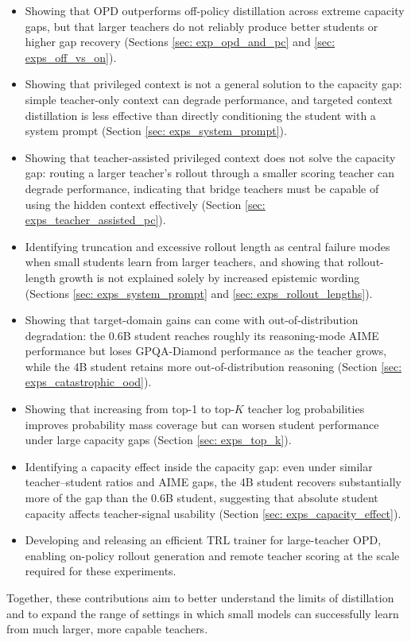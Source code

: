 \begin{itemize}
    \item Showing that OPD outperforms off-policy distillation across extreme capacity gaps, but that larger teachers do not reliably produce better students or higher gap recovery (Sections \ref{sec: exp_opd_and_pc} and \ref{sec: exps_off_vs_on}).
    \item Showing that privileged context is not a general solution to the capacity gap: simple teacher-only context can degrade performance, and targeted context distillation is less effective than directly conditioning the student with a system prompt (Section \ref{sec: exps_system_prompt}).
    \item Showing that teacher-assisted privileged context does not solve the capacity gap: routing a larger teacher's rollout through a smaller scoring teacher can degrade performance, indicating that bridge teachers must be capable of using the hidden context effectively (Section \ref{sec: exps_teacher_assisted_pc}).
    \item Identifying truncation and excessive rollout length as central failure modes when small students learn from larger teachers, and showing that rollout-length growth is not explained solely by increased epistemic wording (Sections \ref{sec: exps_system_prompt} and \ref{sec: exps_rollout_lengths}).
    \item Showing that target-domain gains can come with out-of-distribution degradation: the 0.6B student reaches roughly its reasoning-mode AIME performance but loses GPQA-Diamond performance as the teacher grows, while the 4B student retains more out-of-distribution reasoning (Section \ref{sec: exps_catastrophic_ood}).
    \item Showing that increasing from top-1 to top-$K$ teacher log probabilities improves probability mass coverage but can worsen student performance under large capacity gaps (Section \ref{sec: exps_top_k}).
    \item Identifying a capacity effect inside the capacity gap: even under similar teacher--student ratios and AIME gaps, the 4B student recovers substantially more of the gap than the 0.6B student, suggesting that absolute student capacity affects teacher-signal usability (Section \ref{sec: exps_capacity_effect}).
    \item Developing and releasing an efficient TRL trainer for large-teacher OPD, enabling on-policy rollout generation and remote teacher scoring at the scale required for these experiments.
\end{itemize}

Together, these contributions aim to better understand the limits of distillation and to expand the range of settings in which small models can successfully learn from much larger, more capable teachers.

